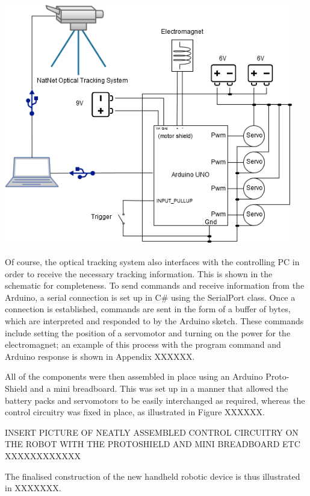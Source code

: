 \documentclass[11pt]{article}
\begin{document}
\begin{center}
\includegraphics[width=0.95\textwidth]{images/newSchematic.png}
\label{figure:schematic}
\end{center}

Of course, the optical tracking system also interfaces with the controlling PC in order to receive the necessary tracking information. This is shown in the schematic for completeness. To send commands and receive information from the Arduino, a serial connection is set up in C\# using the SerialPort class. Once a connection is established, commands are sent in the form of a buffer of bytes, which are interpreted and responded to by the Arduino sketch. These commands include setting the position of a servomotor and turning on the power for the electromagnet; an example of this process with the program command and Arduino response is shown in Appendix XXXXXX.

All of the components were then assembled in place using an Arduino Proto-Shield and a mini breadboard. This was set up in a manner that allowed the battery packs and servomotors to be easily interchanged as required, whereas the control circuitry was fixed in place, as illustrated in Figure XXXXXX.

INSERT PICTURE OF NEATLY ASSEMBLED CONTROL CIRCUITRY ON THE ROBOT WITH THE PROTOSHIELD AND MINI BREADBOARD ETC XXXXXXXXXXXX

The finalised construction of the new handheld robotic device is thus illustrated in XXXXXXX.
\end{document}
